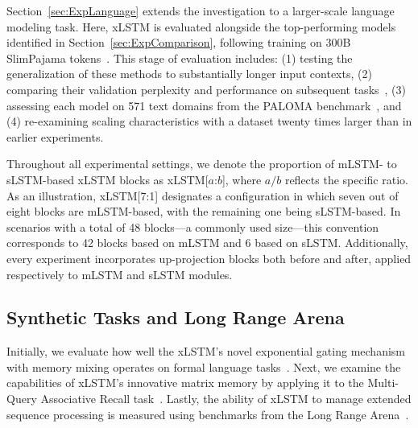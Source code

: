 Section~\ref{sec:ExpLanguage} extends the investigation to a larger-scale language modeling task. Here, xLSTM is evaluated alongside the top-performing models identified in Section~\ref{sec:ExpComparison}, following training on 300B SlimPajama tokens~\citep{Soboleva:23}. This stage of evaluation includes: (1) testing the generalization of these methods to substantially longer input contexts, (2) comparing their validation perplexity and performance on subsequent tasks~\citep{Sutawika:24}, (3) assessing each model on 571 text domains from the PALOMA benchmark~\citep{Magnusson:23arxivshort}, and (4) re-examining scaling characteristics with a dataset twenty times larger than in earlier experiments.

\label{sec:xlstm_blocks_notation}
Throughout all experimental settings, we denote the proportion of mLSTM- to sLSTM-based xLSTM blocks as xLSTM[$a$:$b$], where $a/b$ reflects the specific ratio. As an illustration, xLSTM[7:1] designates a configuration in which seven out of eight blocks are mLSTM-based, with the remaining one being sLSTM-based. In scenarios with a total of 48 blocks—a commonly used size—this convention corresponds to 42 blocks based on mLSTM and 6 based on sLSTM. Additionally, every experiment incorporates up-projection blocks both before and after, applied respectively to mLSTM and sLSTM modules.

\subsection{Synthetic Tasks and Long Range Arena}
\label{sec:ExpSyntethic}
Initially, we evaluate how well the xLSTM's novel exponential gating mechanism with memory mixing operates on formal language tasks~\citep{Deletang:23}. Next, we examine the capabilities of xLSTM's innovative matrix memory by applying it to the Multi-Query Associative Recall task~\citep{Arora:23arxiv}. Lastly, the ability of xLSTM to manage extended sequence processing is measured using benchmarks from the Long Range Arena~\citep{Tay:21}.

